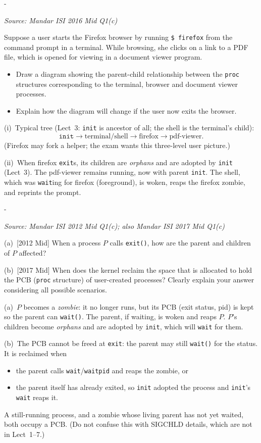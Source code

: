 \documentclass[11pt,a4paper]{article}
\makeatletter
\newcommand{\keepspace}[1]{\par\penalty-100\begingroup
  \setlength{\dimen@}{#1}\dimen@ii\pagegoal\advance\dimen@ii-\pagetotal
  \ifdim\dimen@>\dimen@ii\ifdim\dimen@ii>\z@\vfil\fi\break\fi\endgroup}
\newcounter{qn}[section]
\newenvironment{Qn}[4]{%
  \refstepcounter{qn}\keepspace{7\baselineskip}%
  \begin{tcolorbox}[qboxstyle, title={Q\thesection.\theqn\ \ [#1 \textbar\ #2]\ \ #4}]%
  {\footnotesize\color{g3}\textit{Source: #3}}\par\smallskip%
}{%
  \end{tcolorbox}%
}
\newenvironment{Sol}{%
  \begin{tcolorbox}[sboxstyle, title={Solution}]%
}{%
  \end{tcolorbox}\vspace{0.35em}%
}
\makeatother
\begin{document}
\begin{Qn}{Medium}{Lect 3}{Mandar ISI 2016 Mid Q1(c)}{Terminal, Firefox, PDF viewer: \texttt{proc} tree, then the browser exits}
Suppose a user starts the Firefox browser by running \texttt{\$ firefox} from the command prompt in a terminal. While browsing, she clicks on a link to a PDF file, which is opened for viewing in a document viewer program.
\begin{itemize}
  \item[(i)] Draw a diagram showing the parent-child relationship between the \texttt{proc} structures corresponding to the terminal, browser and document viewer processes.
  \item[(ii)] Explain how the diagram will change if the user now exits the browser.
\end{itemize}
\end{Qn}
\begin{Sol}
(i)~Typical tree (Lect~3: \texttt{init} is ancestor of all; the shell is the terminal's child):
\[
\texttt{init} \to \text{terminal/shell} \to \text{firefox} \to \text{pdf-viewer}.
\]
(Firefox may fork a helper; the exam wants this three-level user picture.)

(ii)~When firefox \texttt{exit}s, its children are \emph{orphans} and are adopted by \texttt{init} (Lect~3). The pdf-viewer remains running, now with parent \texttt{init}. The shell, which was \texttt{wait}ing for firefox (foreground), is woken, reaps the firefox zombie, and reprints the prompt.
\end{Sol}

\begin{Qn}{Medium}{Lect 3}{Mandar ISI 2012 Mid Q1(c); also Mandar ISI 2017 Mid Q1(c)}{\texttt{exit}, zombies, orphans, when the PCB is reclaimed}
(a)~[2012 Mid] When a process $P$ calls \texttt{exit()}, how are the parent and children of $P$ affected?

(b)~[2017 Mid] When does the kernel reclaim the space that is allocated to hold the PCB (\texttt{proc} structure) of user-created processes? Clearly explain your answer considering all possible scenarios.
\end{Qn}
\begin{Sol}
(a)~$P$ becomes a \emph{zombie}: it no longer runs, but its PCB (exit status, pid) is kept so the parent can \texttt{wait()}. The parent, if waiting, is woken and reaps $P$. $P$'s children become \emph{orphans} and are adopted by \texttt{init}, which will \texttt{wait} for them.

(b)~The PCB cannot be freed at \texttt{exit}: the parent may still \texttt{wait()} for the status. It is reclaimed when
\begin{itemize}
  \item the parent calls \texttt{wait}/\texttt{waitpid} and reaps the zombie, or
  \item the parent itself has already exited, so \texttt{init} adopted the process and \texttt{init}'s \texttt{wait} reaps it.
\end{itemize}
A still-running process, and a zombie whose living parent has not yet waited, both occupy a PCB. (Do not confuse this with SIGCHLD details, which are not in Lect~1--7.)
\end{Sol}
\end{document}
